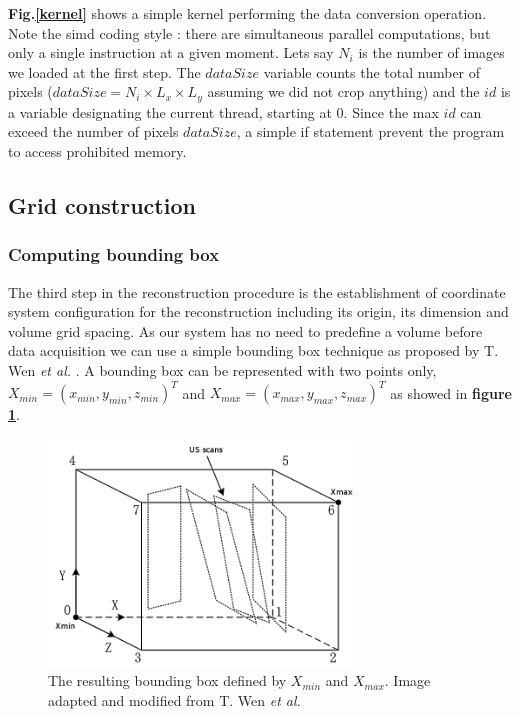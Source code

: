 \documentclass[12pt,journal,compsoc]{IEEEtran}
\begin{document}
\textbf{Fig.\ref{kernel}} shows a simple kernel performing the data conversion operation. Note the \ac{simd} coding style : there are simultaneous parallel computations, but only a single instruction at a given moment. Lets say $N_i$ is the number of images we loaded at the first step. 
The $dataSize$ variable counts the total number of pixels ($dataSize=N_i\times L_x\times L_y$ assuming we did not crop anything) and the $id$ is a variable designating the current thread, starting at 0. Since the max $id$ can exceed the number of pixels $dataSize$, a simple if statement prevent the program to access prohibited memory. 

\subsection{Grid construction}

\subsubsection{Computing bounding box}

The third step in the reconstruction procedure is the establishment of coordinate system configuration for the reconstruction including its origin, its dimension and volume grid spacing. 
As our system has no need to predefine a volume before data acquisition we can use a simple bounding box technique as proposed by T. Wen \textit{et al.} \textbf{\cite{2}}.
A bounding box can be represented with two points only, $X_{min} = (x_{min},y_{min},z_{min})^T$ and $X_{max} = (x_{max}, y_{max}, z_{max})^T$ as showed in \textbf{figure \ref{bounding_box}}.

\begin{figure}[ht!]
\centering
\includegraphics[width=3.2in]{bounding_box}
\caption{The resulting bounding box defined by $X_{min}$ and $X_{max}$. Image adapted and modified from T. Wen \textit{et al.} \textbf{\cite{2}}}
\label{bounding_box}
\end{figure}
\end{document}
